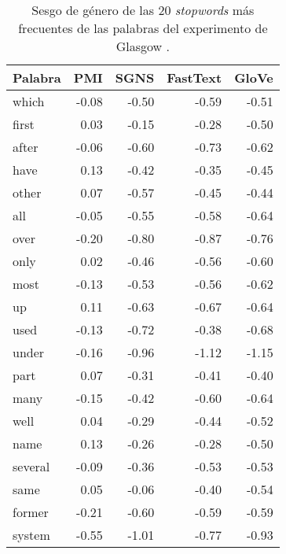 

\begin{table}[h]
  \centering
  \begin{tabular}{lrrrr}
    \toprule
    Palabra & PMI   & SGNS  & FastText & GloVe \\
    \midrule
    which   & -0.08 & -0.50 & -0.59    & -0.51 \\
    first   & 0.03  & -0.15 & -0.28    & -0.50 \\
    after   & -0.06 & -0.60 & -0.73    & -0.62 \\
    have    & 0.13  & -0.42 & -0.35    & -0.45 \\
    other   & 0.07  & -0.57 & -0.45    & -0.44 \\
    all     & -0.05 & -0.55 & -0.58    & -0.64 \\
    over    & -0.20 & -0.80 & -0.87    & -0.76 \\
    only    & 0.02  & -0.46 & -0.56    & -0.60 \\
    most    & -0.13 & -0.53 & -0.56    & -0.62 \\
    up      & 0.11  & -0.63 & -0.67    & -0.64 \\
    used    & -0.13 & -0.72 & -0.38    & -0.68 \\
    under   & -0.16 & -0.96 & -1.12    & -1.15 \\
    part    & 0.07  & -0.31 & -0.41    & -0.40 \\
    many    & -0.15 & -0.42 & -0.60    & -0.64 \\
    well    & 0.04  & -0.29 & -0.44    & -0.52 \\
    name    & 0.13  & -0.26 & -0.28    & -0.50 \\
    several & -0.09 & -0.36 & -0.53    & -0.53 \\
    same    & 0.05  & -0.06 & -0.40    & -0.54 \\
    former  & -0.21 & -0.60 & -0.59    & -0.59 \\
    system  & -0.55 & -1.01 & -0.77    & -0.93 \\
    \bottomrule
  \end{tabular}
  \caption[Sesgo de género de las 20 \emph{stopwords} más frecuentes de las palabras del experimento de Glasgow \citep{scott2019glasgow}]{
    Sesgo de género de las 20 \emph{stopwords} más frecuentes de las palabras del experimento de Glasgow \citep{scott2019glasgow}.
  }
  \label{tab:stopwords}
\end{table}

